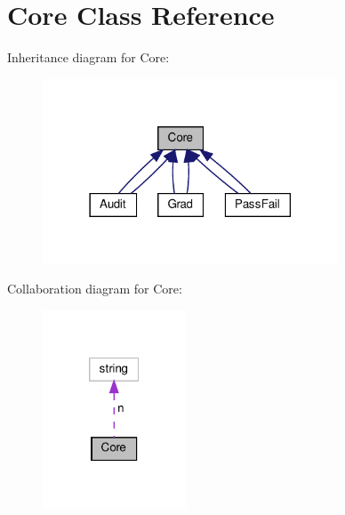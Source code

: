 \hypertarget{classCore}{}\section{Core Class Reference}
\label{classCore}


Inheritance diagram for Core\+:\nopagebreak
\begin{figure}[H]
\begin{center}
\leavevmode
\includegraphics[width=249pt]{classCore__inherit__graph}
\end{center}
\end{figure}


Collaboration diagram for Core\+:\nopagebreak
\begin{figure}[H]
\begin{center}
\leavevmode
\includegraphics[width=121pt]{classCore__coll__graph}
\end{center}
\end{figure}
